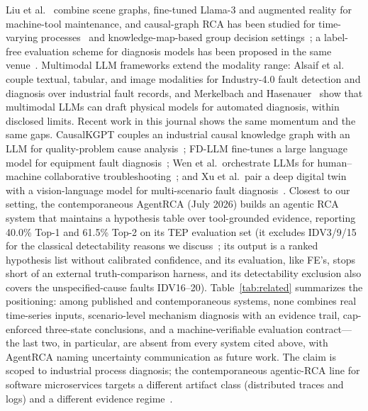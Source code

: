 \documentclass[preprint,10pt]{elsarticle}
\begin{document}
Liu et al.~\cite{liu2025probing} combine scene graphs, fine-tuned Llama-3 and augmented reality for machine-tool maintenance, and causal-graph RCA has been studied for time-varying processes~\cite{liu2025spatial} and knowledge-map-based group decision settings~\cite{yue2023root}; a label-free evaluation scheme for diagnosis models has been proposed in the same venue~\cite{liu2024label}. Multimodal LLM frameworks extend the modality range: Alsaif et al.~\cite{alsaif2024multimodal} couple textual, tabular, and image modalities for Industry-4.0 fault detection and diagnosis over industrial fault records, and Merkelbach and Hasenauer~\cite{merkelbach2024multimodal} show that multimodal LLMs can draft physical models for automated diagnosis, within disclosed limits.
Recent work in this journal shows the same momentum and the same gaps.  CausalKGPT couples an industrial causal knowledge graph with an LLM for quality-problem cause analysis~\cite{zhou2024causalkgpt}; FD-LLM fine-tunes a large language model for equipment fault diagnosis~\cite{lin2025fdllm}; Wen et al.\ orchestrate LLMs for human--machine collaborative troubleshooting~\cite{wen2025troubleshooting}; and Xu et al.\ pair a deep digital twin with a vision-language model for multi-scenario fault diagnosis~\cite{xu2026digitaltwin}. Closest to our setting, the contemporaneous AgentRCA (July 2026) builds an agentic RCA system that maintains a hypothesis table over tool-grounded evidence, reporting 40.0\% Top-1 and 61.5\% Top-2 on its TEP evaluation set (it excludes IDV3/9/15 for the classical detectability reasons we discuss~\cite{wei2026agentrca}; its output is a ranked hypothesis list without calibrated confidence, and its evaluation, like FE's, stops short of an external truth-comparison harness, and its detectability exclusion also covers the unspecified-cause faults IDV16--20). Table~\ref{tab:related} summarizes the positioning: among published and contemporaneous systems, none combines real time-series inputs, scenario-level mechanism diagnosis with an evidence trail, cap-enforced three-state conclusions, and a machine-verifiable evaluation contract---the last two, in particular, are absent from every system cited above, with AgentRCA naming uncertainty communication as future work. The claim is scoped to industrial process diagnosis; the contemporaneous agentic-RCA line for software microservices targets a different artifact class (distributed traces and logs) and a different evidence regime~\cite{chen2023automatic}.
\end{document}
